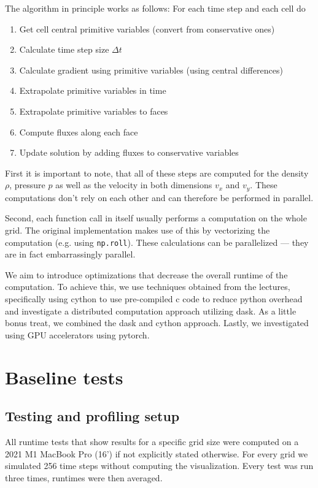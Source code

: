 \documentclass[a4paper,10pt]{article}
\begin{document}
The algorithm in principle works as follows:
For each time step and each cell do
\begin{enumerate}
  \item Get cell central primitive variables (convert from conservative ones)
  \item Calculate time step size $\Delta t$
  \item Calculate gradient using primitive variables (using central differences)
  \item Extrapolate primitive variables in time
  \item Extrapolate primitive variables to faces
  \item Compute fluxes along each face
  \item Update solution by adding fluxes to conservative variables
\end{enumerate}

First it is important to note, that all of these steps are computed for the density $\rho$, pressure $p$ as well as the velocity in both dimensions $v_x$ and $v_y$.
These computations don't rely on each other and can therefore be performed in parallel.

Second, each function call in itself usually performs a computation on the whole grid.
The original implementation makes use of this by vectorizing the computation (e.g. using \verb|np.roll|).
These calculations can be parallelized --- they are in fact embarrassingly parallel.

We aim to introduce optimizations that decrease the overall runtime of the computation.
To achieve this, we use techniques obtained from the lectures, specifically using cython to use pre-compiled c code to reduce python overhead and investigate a distributed computation approach utilizing dask.
As a little bonus treat, we combined the dask and cython approach.
Lastly, we investigated using GPU accelerators using pytorch.

\section{Baseline tests}
\subsection{Testing and profiling setup}
All runtime tests that show results for a specific grid size were computed on a 2021 M1 MacBook Pro (16') if not explicitly stated otherwise.
For every grid we simulated 256 time steps without computing the visualization.
Every test was run three times, runtimes were then averaged.
\end{document}
